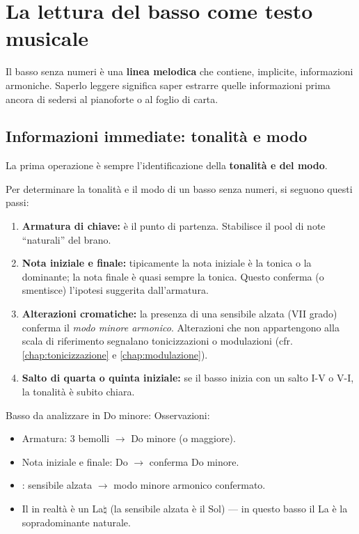 \section{La lettura del basso come testo musicale}
\label{sec:lettura_basso}

Il basso senza numeri è una \textbf{linea melodica} che contiene, implicite, informazioni armoniche. Saperlo leggere significa saper estrarre quelle informazioni prima ancora di sedersi al pianoforte o al foglio di carta.

\subsection{Informazioni immediate: tonalità e modo}

La prima operazione è sempre l'identificazione della \textbf{tonalità e del modo}.

\begin{regola}
	\label{reg:identificazione_tonalita}
	Per determinare la tonalità e il modo di un basso senza numeri, si seguono questi passi:
	\begin{enumerate}
		\item \textbf{Armatura di chiave:} è il punto di partenza. Stabilisce il pool di note ``naturali'' del brano.
		\item \textbf{Nota iniziale e finale:} tipicamente la nota iniziale è la tonica o la dominante; la nota finale è quasi sempre la tonica. Questo conferma (o smentisce) l'ipotesi suggerita dall'armatura.
		\item \textbf{Alterazioni cromatiche:} la presenza di una sensibile alzata (VII grado) conferma il \textit{modo minore armonico}. Alterazioni che non appartengono alla scala di riferimento segnalano tonicizzazioni o modulazioni (cfr. \ref{chap:tonicizzazione} e \ref{chap:modulazione}).
		\item \textbf{Salto di quarta o quinta iniziale:} se il basso inizia con un salto I-V o V-I, la tonalità è subito chiara.
	\end{enumerate}
\end{regola}

\begin{esempio}
	\label{ex:identificazione_tonalita}
	Basso da analizzare in Do minore:
	Osservazioni:
	\begin{itemize}
		\item Armatura: 3 bemolli $\rightarrow$ Do minore (o \Mibemolle  maggiore).
		\item Nota iniziale e finale: Do $\rightarrow$ conferma Do minore.
		\item \Soldiesis : sensibile alzata $\rightarrow$ modo minore armonico confermato.
		\item Il \Ladiesis  in realtà è un La$\natural$ (la sensibile alzata è il Sol\diesis{}) --- in questo basso il La è la sopradominante naturale.
	\end{itemize}
\end{esempio}

